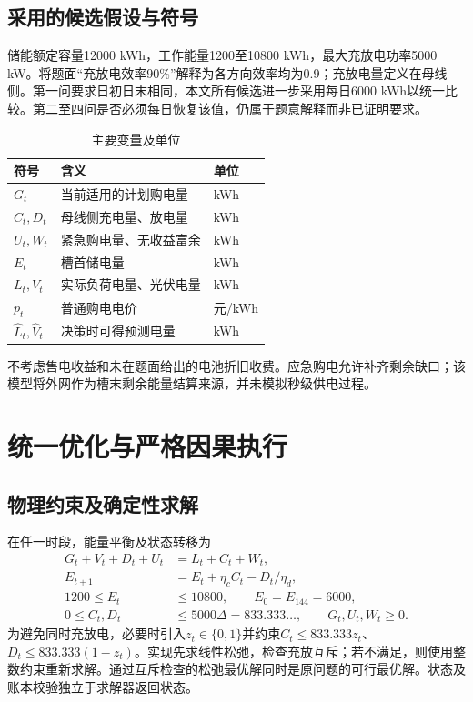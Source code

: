 \documentclass[UTF8,a4paper,zihao=-4,fontset=fandol]{ctexart}
\begin{document}
\subsection{采用的候选假设与符号}
储能额定容量12000 kWh，工作能量1200至10800 kWh，最大充放电功率5000 kW。将题面“充放电效率90\%”解释为各方向效率均为0.9；充放电量定义在母线侧。第一问要求日初日末相同，本文所有候选进一步采用每日6000 kWh以统一比较。第二至四问是否必须每日恢复该值，仍属于题意解释而非已证明要求。
\begin{table}[H]\centering\caption{主要变量及单位}
\begin{tabular}{lll}\toprule 符号 & 含义 & 单位\\\midrule
$G_t$ & 当前适用的计划购电量 & kWh\\
$C_t,D_t$ & 母线侧充电量、放电量 & kWh\\
$U_t,W_t$ & 紧急购电量、无收益富余 & kWh\\
$E_t$ & 槽首储电量 & kWh\\
$L_t,V_t$ & 实际负荷电量、光伏电量 & kWh\\
$p_t$ & 普通购电电价 & 元/kWh\\
$\widehat L_t,\widehat V_t$ & 决策时可得预测电量 & kWh\\\bottomrule\end{tabular}
\end{table}
不考虑售电收益和未在题面给出的电池折旧收费。应急购电允许补齐剩余缺口；该模型将外网作为槽末剩余能量结算来源，并未模拟秒级供电过程。

\section{统一优化与严格因果执行}
\subsection{物理约束及确定性求解}
在任一时段，能量平衡及状态转移为
\begin{align}
G_t+V_t+D_t+U_t &= L_t+C_t+W_t,\\
E_{t+1}&=E_t+\eta_c C_t-D_t/\eta_d,\\
1200\le E_t&\le10800,\qquad E_0=E_{144}=6000,\\
0\le C_t,D_t&\le5000\Delta=833.333\ldots,\qquad G_t,U_t,W_t\ge0.
\end{align}
为避免同时充放电，必要时引入$z_t\in\{0,1\}$并约束$C_t\le833.333z_t$、$D_t\le833.333(1-z_t)$。实现先求线性松弛，检查充放互斥；若不满足，则使用整数约束重新求解。通过互斥检查的松弛最优解同时是原问题的可行最优解。状态及账本校验独立于求解器返回状态。
\end{document}
